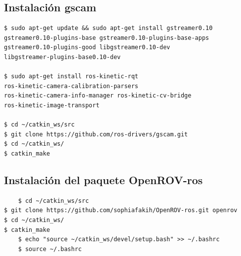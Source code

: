     \subsection{Instalación gscam}
    \begin{verbatim}
$ sudo apt-get update && sudo apt-get install gstreamer0.10 
gstreamer0.10-plugins-base gstreamer0.10-plugins-base-apps 
gstreamer0.10-plugins-good libgstreamer0.10-dev 
libgstreamer-plugins-base0.10-dev

$ sudo apt-get install ros-kinetic-rqt 
ros-kinetic-camera-calibration-parsers 
ros-kinetic-camera-info-manager ros-kinetic-cv-bridge 
ros-kinetic-image-transport

$ cd ~/catkin_ws/src
$ git clone https://github.com/ros-drivers/gscam.git
$ cd ~/catkin_ws/
$ catkin_make
    \end{verbatim}
    
    
    \subsection{Instalación del paquete OpenROV-ros}

	\begin{verbatim}
	$ cd ~/catkin_ws/src
$ git clone https://github.com/sophiafakih/OpenROV-ros.git openrov
$ cd ~/catkin_ws/
$ catkin_make
	$ echo "source ~/catkin_ws/devel/setup.bash" >> ~/.bashrc
	$ source ~/.bashrc
	\end{verbatim}



	






